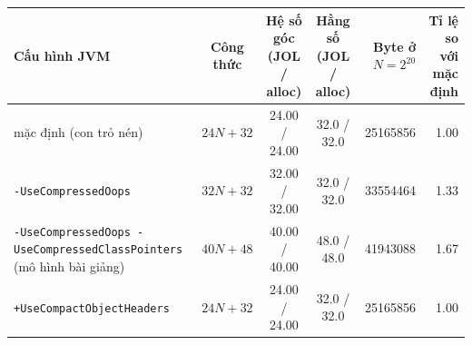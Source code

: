 \begin{tabularx}{\linewidth}{Xcccrr}
\toprule
Cấu hình JVM & Công thức & \makecell{Hệ số góc \\ (JOL / alloc)} & \makecell{Hằng số \\ (JOL / alloc)} & \makecell{Byte ở \\ $N{=}2^{20}$} & \makecell{Tỉ lệ so \\ với mặc định} \\
\midrule
mặc định (con trỏ nén) & $24N + 32$ & 24.00 / 24.00 & 32.0 / 32.0 & \num{25165856} & 1.00 \\
\texttt{-UseCompressedOops} & $32N + 32$ & 32.00 / 32.00 & 32.0 / 32.0 & \num{33554464} & 1.33 \\
\texttt{-UseCompressedOops -UseCompressedClassPointers} (mô hình bài giảng) & $40N + 48$ & 40.00 / 40.00 & 48.0 / 48.0 & \num{41943088} & 1.67 \\
\texttt{+UseCompactObjectHeaders} & $24N + 32$ & 24.00 / 24.00 & 32.0 / 32.0 & \num{25165856} & 1.00 \\
\bottomrule
\end{tabularx}

